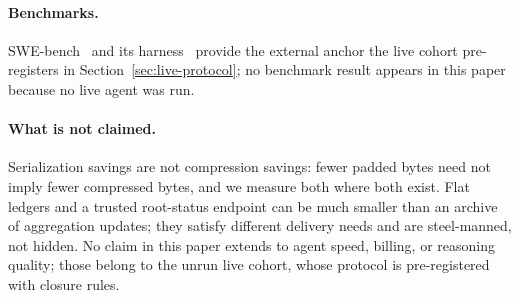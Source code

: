\paragraph{Benchmarks.}
SWE-bench~\cite{swebench} and its harness~\cite{swebenchharness}
provide the external anchor the live cohort pre-registers in
Section~\ref{sec:live-protocol}; no benchmark result appears in this
paper because no live agent was run.

\paragraph{What is not claimed.}
Serialization savings are not compression savings: fewer padded bytes
need not imply fewer compressed bytes, and we measure both where both
exist. Flat ledgers and a trusted root-status endpoint can be much
smaller than an archive of aggregation updates; they satisfy different
delivery needs and are steel-manned, not hidden. No claim in this
paper extends to agent speed, billing, or reasoning quality; those
belong to the unrun live cohort, whose protocol is pre-registered with
closure rules.
